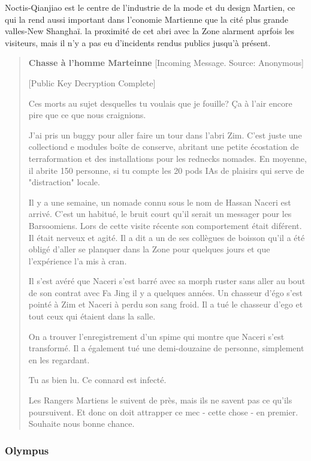 Noctis-Qianjiao est le centre de l'industrie de la mode et du design Martien, ce qui la rend aussi important dans l'conomie Martienne que la cité plus grande valles-New Shanghaï. la proximité de cet abri avec la Zone alarment aprfois les visiteurs, mais il n'y a pas eu d'incidents rendus publics jusqu'à présent. 

\begin{quotation} \textbf{Chasse à l'homme Marteinne} [Incoming Message. Source: Anonymous] 

[Public Key Decryption Complete] 

Ces morts au sujet desquelles tu voulais que je fouille? Ça à l'air encore pire que ce que nous craignions. 

J'ai pris un buggy pour aller faire un tour dans l'abri Zim. C'est juste une collectiond e modules boîte de conserve, abritant une petite écostation de terraformation et des installations pour les rednecks nomades. En moyenne, il abrite 150 personne, si tu compte les 20 pods IAs de plaisirs qui serve de "distraction" locale. 

Il y a une semaine, un nomade connu sous le nom de Hassan Naceri est arrivé. C'est un habitué, le bruit court qu'il serait un messager pour les Barsoomiens. Lors de cette visite récente son comportement était diférent. Il était nerveux et agité. Il a dit a un de ses collègues de boisson qu'il a été obligé d'aller se planquer dans la Zone pour quelques jours et que l'expérience l'a mis à cran. 

Il s'est avéré que Naceri s'est barré avec sa morph ruster sans aller au bout de son contrat avec Fa Jing il y a quelques années. Un chasseur d'égo s'est pointé à Zim et Naceri à perdu son sang froid. Il a tué le chasseur d'ego et tout ceux qui étaient dans la salle. 

On a trouver l'enregistrement d'un spime qui montre que Naceri s'est transformé. Il a également tué une demi-douzaine de personne, simplement en les regardant. 

Tu as bien lu. Ce connard est infecté. 

Les Rangers Martiens le suivent de près, mais ils ne savent pas ce qu'ils poursuivent. Et donc on doit attrapper ce mec - cette chose - en premier. Souhaite nous bonne chance. \end{quotation} 

\subsubsection{Olympus} \label{sec:olympus} 

